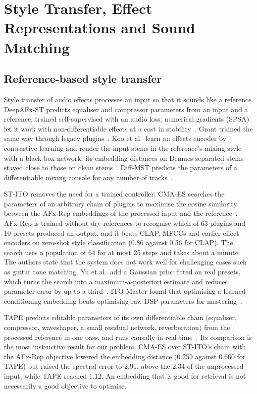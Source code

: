 \section{Style Transfer, Effect Representations and Sound Matching}
\label{sec:matching}

\subsection{Reference-based style transfer}

Style transfer of audio effects processes an input so that it sounds like a
reference. DeepAFx-ST predicts equaliser and compressor parameters from an
input and a reference, trained self-supervised with an audio loss; numerical
gradients (SPSA) let it work with non-differentiable effects at a cost in
stability~\cite{steinmetz2022style}. Grant trained the same way through legacy
plugins~\cite{grant2023style}. Koo et al.\ learn an effects encoder by
contrastive learning and render the input stems in the reference's mixing
style with a black-box network; its embedding distances on Demucs-separated
stems stayed close to those on clean stems~\cite{koo2023music}. Diff-MST
predicts the parameters of a differentiable mixing console for any number of
tracks~\cite{vanka2024diffmst}.

ST-ITO removes the need for a trained controller: CMA-ES searches the
parameters of an arbitrary chain of plugins to maximise the cosine similarity
between the AFx-Rep embeddings of the processed input and the
reference~\cite{steinmetz2024stito}. AFx-Rep is trained without dry references
to recognise which of 63 plugins and 10 presets produced an output, and it
beats CLAP, MFCCs and earlier effect encoders on zero-shot style
classification (0.86 against 0.56 for CLAP). The search uses a population of
64 for at most 25 steps and takes about a minute. The authors state that the
system does not work well for challenging cases such as guitar tone matching.
Yu et al.\ add a Gaussian prior fitted on real presets, which turns the search
into a maximum-a-posteriori estimate and reduces parameter error by up to a
third~\cite{yu2025improving}. ITO-Master found that optimising a learned
conditioning embedding beats optimising raw DSP parameters for
mastering~\cite{koo2025itomaster}.

TAPE predicts editable parameters of its own differentiable chain
(equaliser, compressor, waveshaper, a small residual network, reverberation)
from the processed reference in one pass, and runs causally in real
time~\cite{long2026tape}. Its comparison is the most instructive result for
our problem. CMA-ES over ST-ITO's chain with the AFx-Rep objective lowered the
embedding distance (0.259 against 0.660 for TAPE) but raised the spectral
error to 2.91, above the 2.34 of the unprocessed input, while TAPE reached
1.12. An embedding that is good for retrieval is not necessarily a good
objective to optimise.


